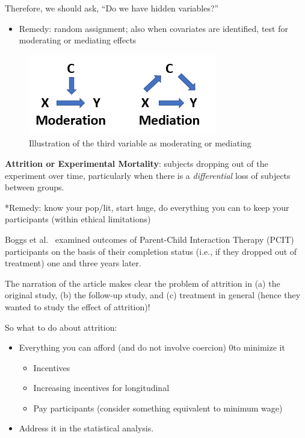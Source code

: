 \documentclass[
  english,
]{book}
\providecommand{\tightlist}{%
  \setlength{\itemsep}{0pt}\setlength{\parskip}{0pt}}
\begin{document}
Therefore, we should ask, ``Do we have hidden variables?''

\begin{itemize}
\tightlist
\item
  Remedy: random assignment; also when covariates are identified, test for moderating or mediating effects
\end{itemize}

\begin{figure}
\centering
\includegraphics{images/Experiment/ModMed.png}
\caption{Illustration of the third variable as moderating or mediating}
\end{figure}

\textbf{Attrition or Experimental Mortality}: subjects dropping out of the experiment over time, particularly when there is a \emph{differential} loss of subjects between groups.

*Remedy: know your pop/lit, start huge, do everything you can to keep your participants (within ethical limitations)

Boggs et al.~\citeyearpar{boggs_outcomes_2005} examined outcomes of Parent-Child Interaction Therapy (PCIT) participants on the basis of their completion status (i.e., if they dropped out of treatment) one and three years later.

The narration of the article makes clear the problem of attrition in (a) the original study, (b) the follow-up study, and (c) treatment in general (hence they wanted to study the effect of attrition)!

So what to do about attrition:

\begin{itemize}
\tightlist
\item
  Everything you can afford (and do not involve coercion) 0to minimize it

  \begin{itemize}
  \tightlist
  \item
    Incentives
  \item
    Increasing incentives for longitudinal
  \item
    Pay participants (consider something equivalent to minimum wage)
  \end{itemize}
\item
  Address it in the statistical analysis.
\end{itemize}
\end{document}
